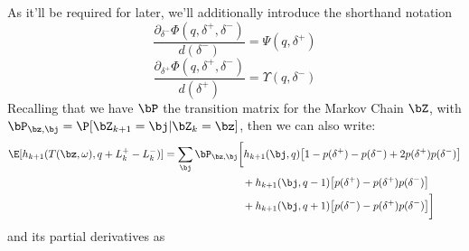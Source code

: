 \documentclass[12pt]{article}
\begin{document}
As it'll be required for later, we'll additionally introduce the shorthand notation
\begin{equation}
\frac{\partial_{\delta^-} \Phi(q, \delta^+, \delta^-)}{d(\delta^-)} = \Psi(q,\delta^+)
\end{equation}
\begin{equation}
\frac{\partial_{\delta^+} \Phi(q, \delta^+, \delta^-)}{d(\delta^+)} = \Upsilon(q,\delta^-)
\end{equation}
Recalling that we have  $\bP$ the transition matrix for the Markov Chain $\bZ$, with $\bP_{\bz, \bj} = \P[\bZ_{k+1} = \bj | \bZ_k = \bz]$, then we can also write:
\begin{equation}
\begin{split}
\E[h_{k+1}(T(\bz,\omega), q + L_k^+ - L_k^- )] & = \sum_\bj \bP_{\bz,\bj} \biggl[ h_{k+1}(\bj, q) \bigl[ 1 - p(\delta^+) - p(\delta^-) + 2 p(\delta^+) p(\delta^-) \bigr]  \\
& \hphantom{\sum_\bj \bP_{\bz,\bj} \biggl[ {}+{}} + h_{k+1}(\bj, q-1) \bigl[ p(\delta^+)  - p(\delta^+) p(\delta^-) \bigr]   \\
& \hphantom{\sum_\bj \bP_{\bz,\bj} \biggl[ {}+{}} + h_{k+1}(\bj, q+1) \bigl[ p(\delta^-)  - p(\delta^+) p(\delta^-) \bigr] \biggr]  \\
\end{split}
\end{equation}
and its partial derivatives as
\end{document}
